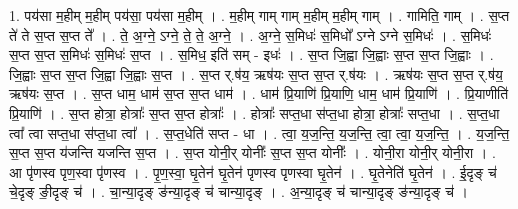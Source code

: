 \documentclass[17pt]{extarticle}
\begin{document}
1. पय॑सा म॒हीम् म॒हीम् पय॑सा॒ पय॑सा म॒हीम् । . म॒हीम् गाम् गाम् म॒हीम् म॒हीम् गाम् । . गामिति॒ गाम् । . स॒प्त ते॑ ते स॒प्त स॒प्त ते᳚ । . ते॒ अ॒ग्ने॒ ऽग्ने॒ ते॒ ते॒ अ॒ग्ने॒ । . अ॒ग्ने॒ स॒मिधः॑ स॒मिधो᳚ ऽग्ने ऽग्ने स॒मिधः॑ । . स॒मिधः॑ स॒प्त स॒प्त स॒मिधः॑ स॒मिधः॑ स॒प्त । . स॒मिध॒ इति॑ सम् - इधः॑ । . स॒प्त जि॒ह्वा जि॒ह्वाः स॒प्त स॒प्त जि॒ह्वाः । . जि॒ह्वाः स॒प्त स॒प्त जि॒ह्वा जि॒ह्वाः स॒प्त । . स॒प्त र्.ष॑य॒ ऋष॑यः स॒प्त स॒प्त र्.ष॑यः । . ऋष॑यः स॒प्त स॒प्त र्.ष॑य॒ ऋष॑यः स॒प्त । . स॒प्त धाम॒ धाम॑ स॒प्त स॒प्त धाम॑ । . धाम॑ प्रि॒याणि॑ प्रि॒याणि॒ धाम॒ धाम॑ प्रि॒याणि॑ । . प्रि॒याणीति॑ प्रि॒याणि॑ । . स॒प्त होत्रा॒ होत्राः᳚ स॒प्त स॒प्त होत्राः᳚ । . होत्राः᳚ सप्त॒धा स॑प्त॒धा होत्रा॒ होत्राः᳚ सप्त॒धा । . स॒प्त॒धा त्वा᳚ त्वा सप्त॒धा स॑प्त॒धा त्वा᳚ । . स॒प्त॒धेति॑ सप्त - धा । . त्वा॒ य॒ज॒न्ति॒ य॒ज॒न्ति॒ त्वा॒ त्वा॒ य॒ज॒न्ति॒ । . य॒ज॒न्ति॒ स॒प्त स॒प्त य॑जन्ति यजन्ति स॒प्त । . स॒प्त योनी॒र् योनीः᳚ स॒प्त स॒प्त योनीः᳚ । . योनी॒रा योनी॒र् योनी॒रा । . आ पृ॑णस्व पृण॒स्वा पृ॑णस्व । . पृ॒ण॒स्वा॒ घृ॒तेन॑ घृ॒तेन॑ पृणस्व पृणस्वा घृ॒तेन॑ । . घृ॒तेनेति॑ घृ॒तेन॑ । . ई॒दृङ् च॑ चे॒दृङ् ङी॒दृङ् च॑ । . चा॒न्या॒दृङ् ङ॑न्या॒दृङ् च॑ चान्या॒दृङ् । . अ॒न्या॒दृङ् च॑ चान्या॒दृङ् ङ॑न्या॒दृङ् च॑ । \newline
\end{document}
